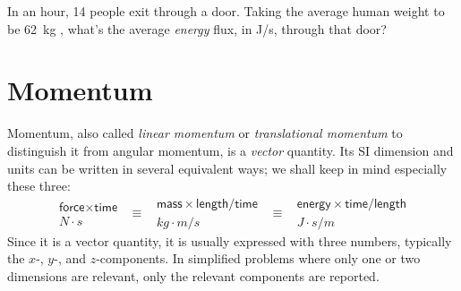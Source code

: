 \documentclass[a4paper,12pt,%
onecolumn,oneside,titlepage,%
british%
]{memoir}
\newcommand{\mynotew}[1]{{\footnotesize\color{midgrey}\faIcon{tools}\ #1}}
\renewcommand*{\|}[1][]{\nonscript\:#1\vert\nonscript\:\mathopen{}}
\newcommand*{\sect}{\S}%
\begin{document}
\medskip

\begin{exercise}
  In an hour, 14 people exit through a door. Taking the average human weight to be \qty{62}{kg} \parencites{walpoleetal2012}, what's the average \emph{energy} flux, in \unit{J/s}, through that door?
\end{exercise}





\section{Momentum}
\label{sec:intro_momentum}

Momentum, also called \emph{linear momentum} or \emph{translational momentum} to distinguish it from angular momentum, is a \emph{vector} quantity. Its SI dimension and units can be written in several equivalent ways; we shall keep in mind especially these three:
\begin{equation*}
  \begin{gathered}
    \textsf{force}\times\textsf{time}
    \\\unit{N\cdot s}
  \end{gathered}
\enspace  \equiv\enspace
  \begin{gathered}
  \textsf{mass}\times\textsf{length}/\textsf{time}
    \\\unit{kg\cdot m/s}
  \end{gathered}
\enspace  \equiv\enspace
  \begin{gathered}
  \textsf{energy}\times\textsf{time}/\textsf{length}
    \\\unit{J\cdot s/m}
  \end{gathered}
\end{equation*}
Since it is a vector quantity, it is usually expressed with three numbers, typically the $x$-, $y$-, and $z$-components. In simplified problems where only one or two dimensions are relevant, only the relevant components are reported.
\end{document}
